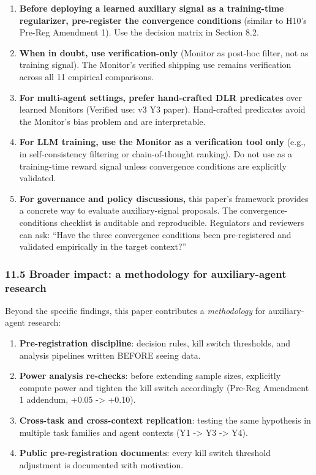\documentclass[
]{article}
\providecommand{\tightlist}{%
  \setlength{\itemsep}{0pt}\setlength{\parskip}{0pt}}
\begin{document}
\begin{enumerate}
\def\labelenumi{\arabic{enumi}.}
\item
  \textbf{Before deploying a learned auxiliary signal as a training-time
  regularizer, pre-register the convergence conditions} (similar to
  H10's Pre-Reg Amendment 1). Use the decision matrix in Section 8.2.
\item
  \textbf{When in doubt, use verification-only} (Monitor as post-hoc
  filter, not as training signal). The Monitor's verified shipping use
  remains verification across all 11 empirical comparisons.
\item
  \textbf{For multi-agent settings, prefer hand-crafted DLR predicates}
  over learned Monitors (Verified use: v3 Y3 paper). Hand-crafted
  predicates avoid the Monitor's bias problem and are interpretable.
\item
  \textbf{For LLM training, use the Monitor as a verification tool only}
  (e.g., in self-consistency filtering or chain-of-thought ranking). Do
  not use as a training-time reward signal unless convergence conditions
  are explicitly validated.
\item
  \textbf{For governance and policy discussions,} this paper's framework
  provides a concrete way to evaluate auxiliary-signal proposals. The
  convergence- conditions checklist is auditable and reproducible.
  Regulators and reviewers can ask: ``Have the three convergence
  conditions been pre-registered and validated empirically in the target
  context?''
\end{enumerate}

\subsubsection{11.5 Broader impact: a methodology for auxiliary-agent
research}\label{broader-impact-a-methodology-for-auxiliary-agent-research}

Beyond the specific findings, this paper contributes a
\emph{methodology} for auxiliary-agent research:

\begin{enumerate}
\def\labelenumi{\arabic{enumi}.}
\tightlist
\item
  \textbf{Pre-registration discipline}: decision rules, kill switch
  thresholds, and analysis pipelines written BEFORE seeing data.
\item
  \textbf{Power analysis re-checks}: before extending sample sizes,
  explicitly compute power and tighten the kill switch accordingly
  (Pre-Reg Amendment 1 addendum, +0.05 -\textgreater{} +0.10).
\item
  \textbf{Cross-task and cross-context replication}: testing the same
  hypothesis in multiple task families and agent contexts (Y1
  -\textgreater{} Y3 -\textgreater{} Y4).
\item
  \textbf{Public pre-registration documents}: every kill switch
  threshold adjustment is documented with motivation.
\end{enumerate}
\end{document}
